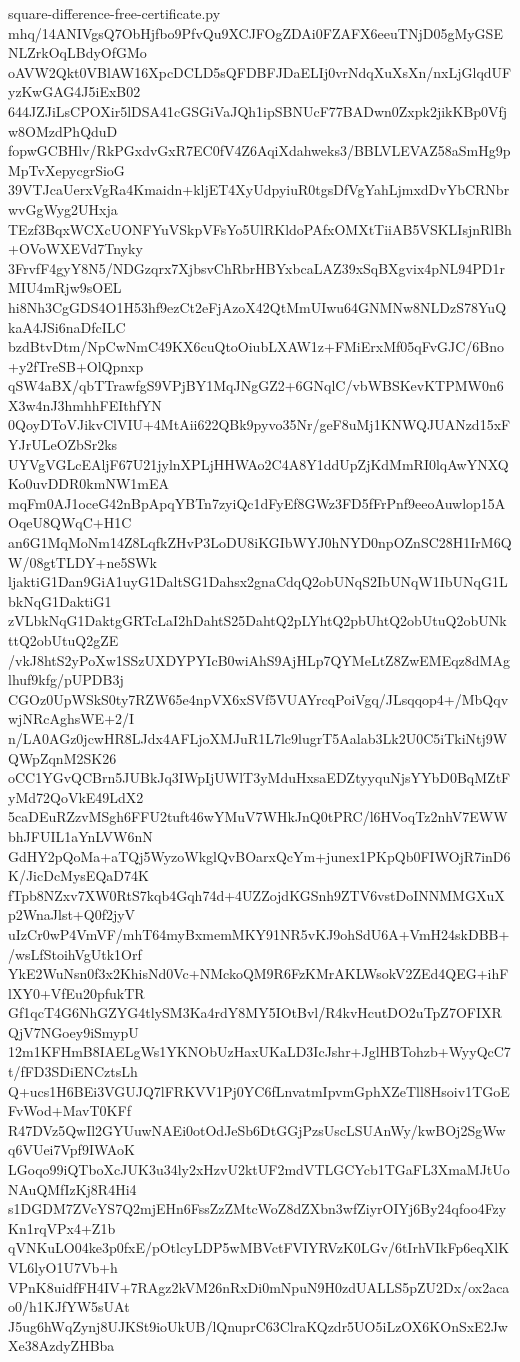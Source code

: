 \documentclass[11pt]{article}
\theoremstyle{definition}
\theoremstyle{remark}
\begin{document}
\begin{filecontents*}[overwrite]{square-difference-free-certificate.py}
mhq/14ANIVgsQ7ObHjfbo9PfvQu9XCJFOgZDAi0FZAFX6eeuTNjD05gMyGSENLZrkOqLBdyOfGMo
oAVW2Qkt0VBlAW16XpcDCLD5sQFDBFJDaELIj0vrNdqXuXsXn/nxLjGlqdUFyzKwGAG4J5iExB02
644JZJiLsCPOXir5lDSA41cGSGiVaJQh1ipSBNUcF77BADwn0Zxpk2jikKBp0Vfjw8OMzdPhQduD
fopwGCBHlv/RkPGxdvGxR7EC0fV4Z6AqiXdahweks3/BBLVLEVAZ58aSmHg9pMpTvXepycgrSioG
39VTJcaUerxVgRa4Kmaidn+kljET4XyUdpyiuR0tgsDfVgYahLjmxdDvYbCRNbrwvGgWyg2UHxja
TEzf3BqxWCXcUONFYuVSkpVFsYo5UlRKldoPAfxOMXtTiiAB5VSKLIsjnRlBh+OVoWXEVd7Tnyky
3FrvfF4gyY8N5/NDGzqrx7XjbsvChRbrHBYxbcaLAZ39xSqBXgvix4pNL94PD1rMIU4mRjw9sOEL
hi8Nh3CgGDS4O1H53hf9ezCt2eFjAzoX42QtMmUIwu64GNMNw8NLDzS78YuQkaA4JSi6naDfcILC
bzdBtvDtm/NpCwNmC49KX6cuQtoOiubLXAW1z+FMiErxMf05qFvGJC/6Bno+y2fTreSB+OlQpnxp
qSW4aBX/qbTTrawfgS9VPjBY1MqJNgGZ2+6GNqlC/vbWBSKevKTPMW0n6X3w4nJ3hmhhFEIthfYN
0QoyDToVJikvClVIU+4MtAii622QBk9pyvo35Nr/geF8uMj1KNWQJUANzd15xFYJrULeOZbSr2ks
UYVgVGLcEAljF67U21jylnXPLjHHWAo2C4A8Y1ddUpZjKdMmRI0lqAwYNXQKo0uvDDR0kmNW1mEA
mqFm0AJ1oceG42nBpApqYBTn7zyiQc1dFyEf8GWz3FD5fFrPnf9eeoAuwlop15AOqeU8QWqC+H1C
an6G1MqMoNm14Z8LqfkZHvP3LoDU8iKGIbWYJ0hNYD0npOZnSC28H1IrM6QW/08gtTLDY+ne5SWk
ljaktiG1Dan9GiA1uyG1DaltSG1Dahsx2gnaCdqQ2obUNqS2IbUNqW1IbUNqG1LbkNqG1DaktiG1
zVLbkNqG1DaktgGRTcLaI2hDahtS25DahtQ2pLYhtQ2pbUhtQ2obUtuQ2obUNkttQ2obUtuQ2gZE
/vkJ8htS2yPoXw1SSzUXDYPYIcB0wiAhS9AjHLp7QYMeLtZ8ZwEMEqz8dMAglhuf9kfg/pUPDB3j
CGOz0UpWSkS0ty7RZW65e4npVX6xSVf5VUAYrcqPoiVgq/JLsqqop4+/MbQqvwjNRcAghsWE+2/I
n/LA0AGz0jcwHR8LJdx4AFLjoXMJuR1L7lc9lugrT5Aalab3Lk2U0C5iTkiNtj9WQWpZqnM2SK26
oCC1YGvQCBrn5JUBkJq3IWpIjUWlT3yMduHxsaEDZtyyquNjsYYbD0BqMZtFyMd72QoVkE49LdX2
5caDEuRZzvMSgh6FFU2tuft46wYMuV7WHkJnQ0tPRC/l6HVoqTz2nhV7EWWbhJFUIL1aYnLVW6nN
GdHY2pQoMa+aTQj5WyzoWkglQvBOarxQcYm+junex1PKpQb0FIWOjR7inD6K/JicDcMysEQaD74K
fTpb8NZxv7XW0RtS7kqb4Gqh74d+4UZZojdKGSnh9ZTV6vstDoINNMMGXuXp2WnaJlst+Q0f2jyV
uIzCr0wP4VmVF/mhT64myBxmemMKY91NR5vKJ9ohSdU6A+VmH24skDBB+/wsLfStoihVgUtk1Orf
YkE2WuNsn0f3x2KhisNd0Vc+NMckoQM9R6FzKMrAKLWsokV2ZEd4QEG+ihFlXY0+VfEu20pfukTR
Gf1qcT4G6NhGZYG4tlySM3Ka4rdY8MY5IOtBvl/R4kvHcutDO2uTpZ7OFIXRQjV7NGoey9iSmypU
12m1KFHmB8IAELgWs1YKNObUzHaxUKaLD3IcJshr+JglHBTohzb+WyyQcC7t/fFD3SDiENCztsLh
Q+ucs1H6BEi3VGUJQ7lFRKVV1Pj0YC6fLnvatmIpvmGphXZeTll8Hsoiv1TGoEFvWod+MavT0KFf
R47DVz5QwIl2GYUuwNAEi0otOdJeSb6DtGGjPzsUscLSUAnWy/kwBOj2SgWwq6VUei7Vpf9IWAoK
LGoqo99iQTboXcJUK3u34ly2xHzvU2ktUF2mdVTLGCYcb1TGaFL3XmaMJtUoNAuQMfIzKj8R4Hi4
s1DGDM7ZVcYS7Q2mjEHn6FssZzZMtcWoZ8dZXbn3wfZiyrOIYj6By24qfoo4FzyKn1rqVPx4+Z1b
qVNKuLO04ke3p0fxE/pOtlcyLDP5wMBVctFVIYRVzK0LGv/6tIrhVIkFp6eqXlKVL6lyO1U7Vb+h
VPnK8uidfFH4IV+7RAgz2kVM26nRxDi0mNpuN9H0zdUALLS5pZU2Dx/ox2acao0/h1KJfYW5sUAt
J5ug6hWqZynj8UJKSt9ioUkUB/lQnuprC63ClraKQzdr5UO5iLzOX6KOnSxE2JwXe38AzdyZHBba

\end{filecontents*}
\end{document}
